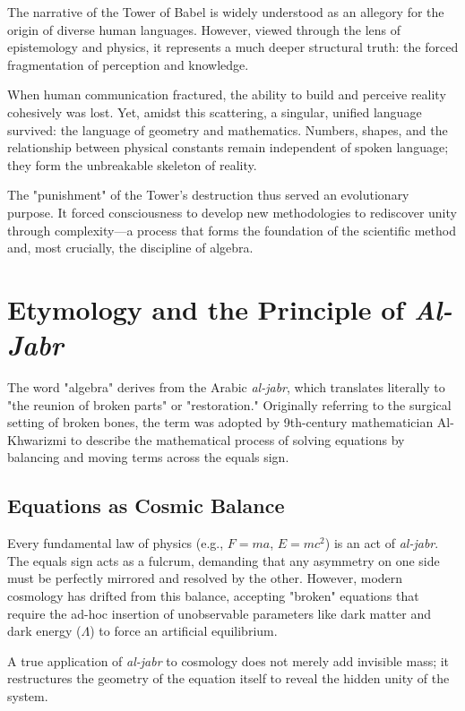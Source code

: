 \documentclass[aps,prd,11pt,onecolumn,superscriptaddress,nofootinbib,floatfix]{revtex4-2}
\begin{document}
The narrative of the Tower of Babel is widely understood as an allegory for the origin of diverse human languages. However, viewed through the lens of epistemology and physics, it represents a much deeper structural truth: the forced fragmentation of perception and knowledge. 

When human communication fractured, the ability to build and perceive reality cohesively was lost. Yet, amidst this scattering, a singular, unified language survived: the language of geometry and mathematics. Numbers, shapes, and the relationship between physical constants remain independent of spoken language; they form the unbreakable skeleton of reality. 

The "punishment" of the Tower's destruction thus served an evolutionary purpose. It forced consciousness to develop new methodologies to rediscover unity through complexity—a process that forms the foundation of the scientific method and, most crucially, the discipline of algebra.

\section{Etymology and the Principle of \textit{Al-Jabr}}
\label{sec:al-jabr}

The word "algebra" derives from the Arabic \textit{al-jabr}, which translates literally to "the reunion of broken parts" or "restoration." Originally referring to the surgical setting of broken bones, the term was adopted by 9th-century mathematician Al-Khwarizmi to describe the mathematical process of solving equations by balancing and moving terms across the equals sign.

\subsection{Equations as Cosmic Balance}
Every fundamental law of physics (e.g., $F=ma$, $E=mc^2$) is an act of \textit{al-jabr}. The equals sign acts as a fulcrum, demanding that any asymmetry on one side must be perfectly mirrored and resolved by the other. However, modern cosmology has drifted from this balance, accepting "broken" equations that require the ad-hoc insertion of unobservable parameters like dark matter and dark energy ($\Lambda$) to force an artificial equilibrium.

A true application of \textit{al-jabr} to cosmology does not merely add invisible mass; it restructures the geometry of the equation itself to reveal the hidden unity of the system.
\end{document}
